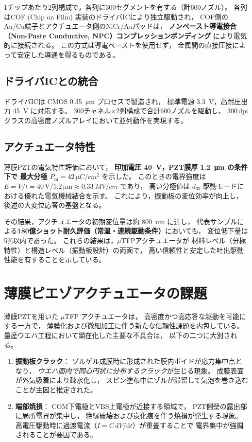 \documentclass[conference]{IEEEtran}
\begin{document}
1チップあたり2列構成で，各列に300セグメントを有する（計600ノズル）。
各列はCOF (Chip on Film) 実装のドライバICにより独立駆動され，
COF側のAu/Cu端子とアクチュエータ側のNiCr/Auパッドは，
\textbf{ノンペースト導電接合（Non-Paste Conductive, NPC）コンプレッションボンディング}
により電気的に接続される。
この方式は導電ペーストを使用せず，
金属間の直接圧接によって安定した導通を得るものである。

\subsection{ドライバICとの統合}
ドライバICは CMOS \SI{0.35}{\micro\metre} プロセスで製造され，
標準電源 \SI{3.3}{V}，高耐圧出力 \SI{45}{V} に対応する。
300チャネル×2列構成で合計600ノズルを駆動し，
300\,dpiクラスの高密度ノズルアレイにおいて並列動作を実現する。

\subsection{アクチュエータ特性}
薄膜PZTの電気特性評価において，
\textbf{印加電圧 \SI{40}{V}，PZT膜厚 \SI{1.2}{\micro m} の条件下で
最大分極 $P_\mathrm{m}=\SI{42}{\micro C/cm^2}$} を示した。
このときの電界強度は
$E = V/t = 40\,\mathrm{V} / 1.2\,\mathrm{\mu m} \approx \SI{0.33}{MV/cm}$ であり，
高い分極値は $d_{33}$ 駆動モードにおける優れた電気機械結合を示す。
これにより，振動板の変位効率が向上し，
後述の大変位応答の基盤となる。

その結果，アクチュエータの初期変位量は約 \SI{800}{nm} に達し，
代表サンプルによる\textbf{180億ショット耐久評価（常温・連続駆動条件）}においても，
変位低下量は5\%以内であった。
これらの結果は，$\mu$TFPアクチュエータが
材料レベル（分極特性）と構造レベル（振動板設計）の両面で，
高い信頼性と安定した吐出駆動性能を有することを示している。

\section{薄膜ピエゾアクチュエータの課題}
薄膜PZTを用いた $\mu$TFP アクチュエータは，
高密度かつ高応答な駆動を可能にする一方で，
薄膜化および微細加工に伴う新たな信頼性課題を内包している。
量産ウエハ工程において顕在化した主要な不具合は，
以下の二つに大別される。

\begin{enumerate}
  \item \textbf{振動板クラック}：  
  ゾルゲル成膜時に形成された膜内ボイドが応力集中点となり，
  \emph{ウエハ面内で同心円状に分布するクラック}が生じる現象。  
  成膜表面が外気吸着により疎水化し，
  スピン塗布中にゾルが滞留して気泡を巻き込むことが主因と推定された。
  \item \textbf{端部焼損}：  
  COM下電極とVBS上電極が近接する領域で，
  PZT側壁の露出部に局所電界が集中し，
  絶縁破壊および炭化痕を伴う焼損が発生する現象。  
  高電圧駆動時に過渡電流（$I = C\,\mathrm{d}V/\mathrm{d}t$）が重畳することで
  電界集中が強調されることが要因である。
\end{enumerate}
\end{document}
